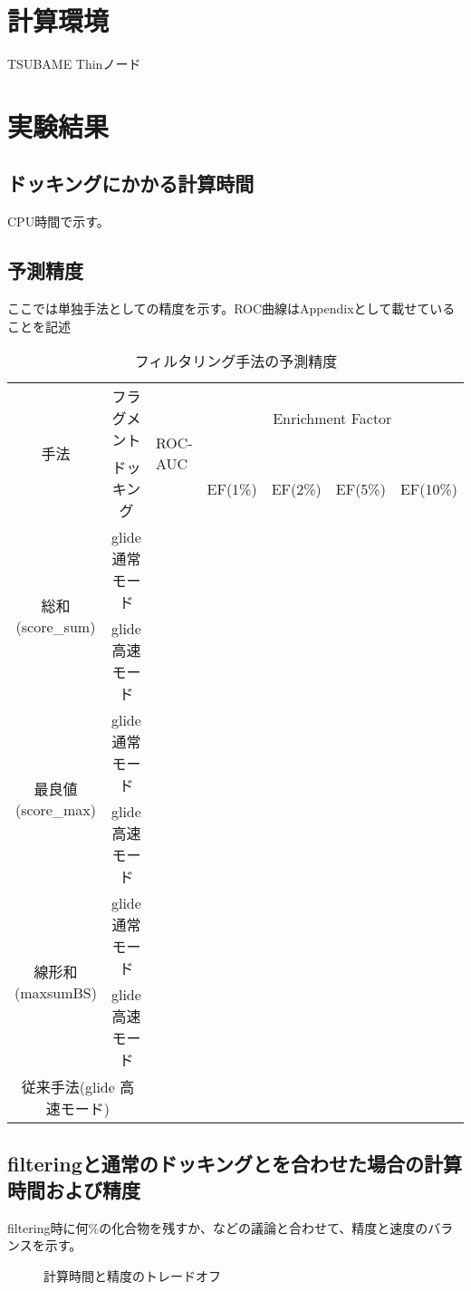 \section{計算環境}
TSUBAME Thinノード
\section{実験結果}
\subsection{ドッキングにかかる計算時間}
CPU時間で示す。
\subsection{予測精度}
ここでは単独手法としての精度を示す。ROC曲線はAppendixとして載せていることを記述

\begin{table}[htb] \centering
	\caption{フィルタリング手法の予測精度}
	\label{tb:filtering_accuracy}
	\begin{tabular}{c|c|lllll|}
	\multirow{2}{*}{手法}				&フラグメント		&\multirow{2}{*}{ROC-AUC}	&\multicolumn{4}{c}{Enrichment Factor}	\\
									&ドッキング		&						&EF(1\%)	&EF(2\%)	&EF(5\%)	&EF(10\%)	\\ \hline
	\multirow{2}{*}{総和(score\_sum)}		&glide 通常モード	&						&		&		&		&			\\
									&glide 高速モード	&						&		&		&		&			\\
	\multirow{2}{*}{最良値(score\_max)}	&glide 通常モード	&						&		&		&		&			\\
									&glide 高速モード	&						&		&		&		&			\\
	\multirow{2}{*}{線形和(maxsumBS)}	&glide 通常モード	&						&		&		&		&			\\
									&glide 高速モード	&						&		&		&		&			\\ \hline
	\multicolumn{2}{c|}{従来手法(glide 高速モード)}			&						&		&		&		&			\\ \hline
	\end{tabular}
\end{table}

\subsection{filteringと通常のドッキングとを合わせた場合の計算時間および精度}
filtering時に何\%の化合物を残すか、などの議論と合わせて、精度と速度のバランスを示す。
\begin{figure}[htp]
 \begin{center}
  \caption{計算時間と精度のトレードオフ}
  \label{fig:trade_off}
 \end{center}
\end{figure}

